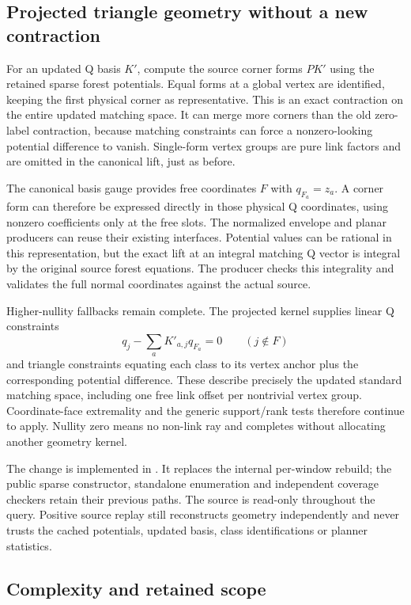 \subsection{Projected triangle geometry without a new contraction}

For an updated Q basis $K'$, compute the source corner forms $PK'$ using
the retained sparse forest potentials. Equal forms at a global vertex are
identified, keeping the first physical corner as representative. This is
an exact contraction on the entire updated matching space. It can merge
more corners than the old zero-label contraction, because matching
constraints can force a nonzero-looking potential difference to vanish.
Single-form vertex groups are pure link factors and are omitted in the
canonical lift, just as before.

The canonical basis gauge provides free coordinates $F$ with
$q_{F_a}=z_a$. A corner form can therefore be expressed directly in those
physical Q coordinates, using nonzero coefficients only at the free slots.
The normalized envelope and planar producers can reuse their existing
interfaces. Potential values can be rational in this representation, but
the exact lift at an integral matching Q vector is integral by the original
source forest equations. The producer checks this integrality and validates
the full normal coordinates against the actual source.

Higher-nullity fallbacks remain complete. The projected kernel supplies
linear Q constraints
\[
                  q_j-\sum_a K'_{a,j}q_{F_a}=0\qquad(j\notin F)
\]
and triangle constraints equating each class to its vertex anchor plus
the corresponding potential difference. These describe precisely the
updated standard matching space, including one free link offset per
nontrivial vertex group. Coordinate-face extremality and the generic
support/rank tests therefore continue to apply. Nullity zero means no
non-link ray and completes without allocating another geometry kernel.

The change is implemented in . It replaces
the internal per-window rebuild; the public sparse constructor, standalone
enumeration and independent coverage checkers retain their previous paths.
The source is read-only throughout the query. Positive source replay still
reconstructs geometry independently and never trusts the cached potentials,
updated basis, class identifications or planner statistics.

\subsection{Complexity and retained scope}

